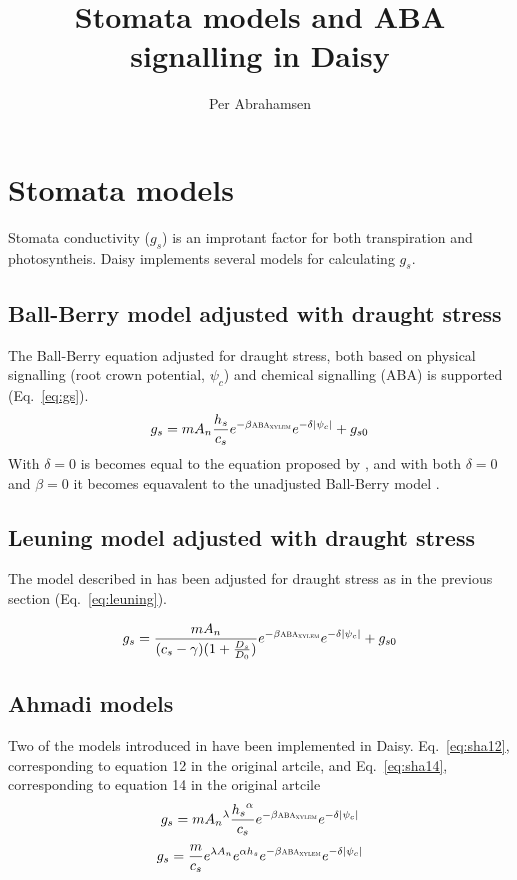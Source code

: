 \documentclass[a4paper,11pt,twoside]{article}
\newcommand{\aba}[1]{\text{\textsc{aba}$_\text{\textsc{#1}}$}}
\begin{document}
\title{Stomata models and ABA signalling in Daisy}
\author{Per Abrahamsen}
\maketitle

\section{Stomata models}
\label{sec:stomata}

Stomata conductivity ($g_s$) is an improtant factor for both
transpiration and photosyntheis.  Daisy implements several models for
calculating $g_s$.

\subsection{Ball-Berry model adjusted with draught stress}

The Ball-Berry equation adjusted for draught stress, both based on
physical signalling (root crown potential, $\psi_c$) and chemical
signalling (ABA) is supported (Eq.~\ref{eq:gs}).
\begin{equation}
  g_s = m A_n \frac{h_s}{c_s} e^{-\beta \aba{xylem}} e^{-\delta |\psi_c|} + g_{s0}
  \label{eq:gs}
\end{equation}
With $\delta = 0$ is becomes equal to the equation proposed by
\citet{gs2002}, and with both $\delta = 0$ and $\beta = 0$ it becomes
equavalent to the unadjusted Ball-Berry model \citep{bb87}.

\subsection{Leuning model adjusted with draught stress}

The model described in \citet{leuning95} has been adjusted for draught
stress as in the previous section (Eq.~\ref{eq:leuning}).

\begin{equation}
  g_s = \frac{m A_n}{(c_s-\gamma)(1 + \frac{D_s}{D_0})} e^{-\beta \aba{xylem}} e^{-\delta |\psi_c|} + g_{s0}
  \label{eq:leuning}
\end{equation}

\subsection{Ahmadi models}

Two of the models introduced in \citet{Ahmadi20091541} have been
implemented in Daisy.  Eq.~\ref{eq:sha12}, corresponding to equation 12
in the original artcile, and Eq.~\ref{eq:sha14}, corresponding to
equation 14 in the original artcile
\begin{equation}
  g_s = m {A_n}^\lambda \frac{{h_s}^\alpha}{c_s} e^{-\beta \aba{xylem}} e^{-\delta |\psi_c|}
  \label{eq:sha12}
\end{equation}
\begin{equation}
  g_s = \frac{m}{c_s} e^{\lambda A_n} e^{\alpha h_s} e^{-\beta
    \aba{xylem}} e^{-\delta |\psi_c|}
  \label{eq:sha14}
\end{equation}
\end{document}
